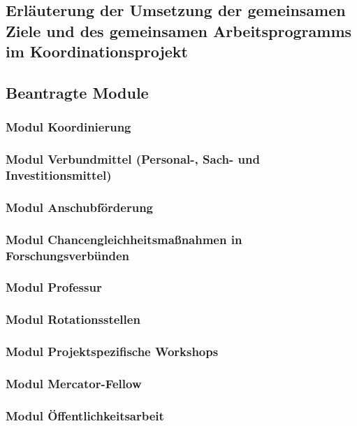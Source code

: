 \documentclass{scrartcl}
\begin{document}
\subsection{Erläuterung der Umsetzung der gemeinsamen Ziele und des gemeinsamen Arbeitsprogramms im Koordinationsprojekt}

\subsection{Beantragte Module}

\subsubsection{Modul Koordinierung}

\subsubsection{Modul Verbundmittel (Personal-, Sach- und Investitionsmittel)}

\subsubsection{Modul Anschubförderung}

\subsubsection{Modul Chancengleichheitsmaßnahmen in Forschungsverbünden}

\subsubsection{Modul Professur}

\subsubsection{Modul Rotationsstellen}

\subsubsection{Modul Projektspezifische Workshops}

\subsubsection{Modul Mercator-Fellow}

\subsubsection{Modul Öffentlichkeitsarbeit}
\end{document}
